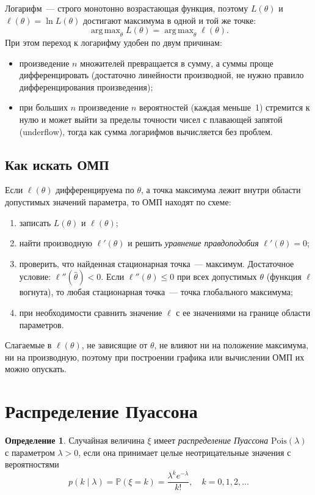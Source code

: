\documentclass[a4paper,12pt]{article}
\theoremstyle{definition}
\newtheorem{definition}{Определение}
\theoremstyle{plain}
\theoremstyle{remark}
\DeclareMathOperator*{\argmax}{arg\,max}
\renewcommand{\P}{\mathbb{P}}
\begin{document}
Логарифм~--- строго монотонно возрастающая функция, поэтому $L(\theta)$ и $\ell(\theta)=\ln L(\theta)$ достигают максимума в одной и той же точке:
$$\argmax_\theta L(\theta)=\argmax_\theta \ell(\theta).$$
При этом переход к логарифму удобен по двум причинам:
\begin{itemize}
  \item произведение $n$ множителей превращается в сумму, а суммы проще дифференцировать (достаточно линейности производной, не нужно правило дифференцирования произведения);
  \item при больших $n$ произведение $n$ вероятностей (каждая меньше~1) стремится к нулю и может выйти за пределы точности чисел с плавающей запятой (underflow), тогда как сумма логарифмов вычисляется без проблем.
\end{itemize}

\subsection{Как искать ОМП}

Если $\ell(\theta)$ дифференцируема по $\theta$, а точка максимума лежит внутри области допустимых значений параметра, то ОМП находят по схеме:
\begin{enumerate}
  \item записать $L(\theta)$ и $\ell(\theta)$;
  \item найти производную $\ell'(\theta)$ и решить \emph{уравнение правдоподобия} $\ell'(\theta)=0$;
  \item проверить, что найденная стационарная точка~--- максимум. Достаточное условие: $\ell''(\hat\theta)<0$. Если $\ell''(\theta)\le0$ при всех допустимых $\theta$ (функция $\ell$ вогнута), то любая стационарная точка~--- точка глобального максимума;
  \item при необходимости сравнить значение $\ell$ с ее значениями на границе области параметров.
\end{enumerate}

Слагаемые в $\ell(\theta)$, не зависящие от $\theta$, не влияют ни на положение максимума, ни на производную, поэтому при построении графика или вычислении ОМП их можно опускать.

\section{Распределение Пуассона}

\begin{definition}
Случайная величина $\xi$ имеет \emph{распределение Пуассона} $\mathrm{Pois}(\lambda)$ с параметром $\lambda>0$, если она принимает целые неотрицательные значения с вероятностями
$$p(k\mid\lambda)=\P(\xi=k)=\frac{\lambda^k e^{-\lambda}}{k!},\quad k=0,1,2,\dots$$
\end{definition}
\end{document}
